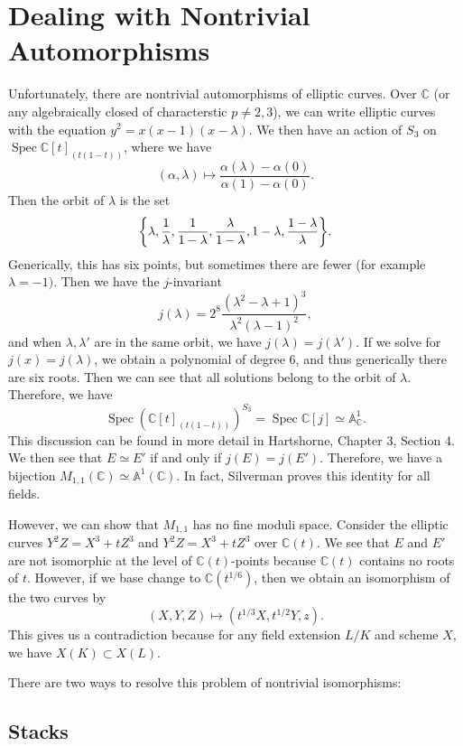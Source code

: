 \documentclass[leqno, openany]{memoir}
\theoremstyle{definition}
\theoremstyle{remark}
\theoremstyle{plain}
\theoremstyle{definition}
\theoremstyle{remark}
\newcommand{\A}{\mathbb{A}}
\newcommand{\C}{\mathbb{C}}
\DeclareMathOperator{\Spec}{Spec}
\begin{document}
\section{Dealing with Nontrivial Automorphisms}%
\label{sec:dealing_with_nontrivial_automorphisms}


Unfortunately, there are nontrivial automorphisms of elliptic curves. Over $\C$ (or any algebraically closed of characterstic $p \neq 2,3$), we can write elliptic curves with the equation $y^2 = x(x-1)(x-\lambda)$. We then have an action of $S_3$ on $\Spec \C[t]_{(t(1-t))}$, where we have
\[ (\alpha, \lambda) \mapsto \frac{\alpha(\lambda) - \alpha(0)}{\alpha(1) - \alpha(0)}. \]
Then the orbit of $\lambda$ is the set 
\[ \qty{ \lambda, \frac{1}{\lambda}, \frac{1}{1-\lambda}, \frac{\lambda}{1-\lambda}, 1-\lambda, \frac{1- \lambda}{\lambda} }. \]
Generically, this has six points, but sometimes there are fewer (for example $\lambda = -1)$. Then we have the $j$-invariant
\[ j(\lambda) = 2^8 \frac{(\lambda^2 - \lambda + 1)^3}{\lambda^2(\lambda - 1)^2}, \]
and when $\lambda, \lambda'$ are in the same orbit, we have $j(\lambda) = j(\lambda')$. If we solve for $j(x) = j(\lambda)$, we obtain a polynomial of degree $6$, and thus generically there are six roots. Then we can see that all solutions belong to the orbit of $\lambda$. Therefore, we have
\[ \Spec (\C[t]_{(t(1-t))})^{S_3} = \Spec \C[j] \simeq \A^1_{\C}. \]
This discussion can be found in more detail in Hartshorne, Chapter 3, Section 4. We then see that $E \simeq E'$ if and only if $j(E) = j(E')$. Therefore, we have a bijection $M_{1,1}(\C) \simeq \A^1(\C)$. In fact, Silverman proves this identity for all fields.

However, we can show that $M_{1,1}$ has no fine moduli space. Consider the elliptic curves $Y^2Z = X^3 + tZ^3$ and $Y^2Z = X^3+tZ^3$ over $\C(t)$. We see that $E$ and $E'$ are not isomorphic at the level of $\C(t)$-points because $\C(t)$ contains no roots of $t$. However, if we base change to $\C(t^{1/6})$, then we obtain an isomorphism of the two curves by
\[ (X,Y,Z) \mapsto (t^{1/3}X, t^{1/2}Y, z). \]
This gives us a contradiction because for any field extension $L/K$ and scheme $X$, we have $X(K) \subset X(L)$.

There are two ways to resolve this problem of nontrivial isomorphisms:

\subsection{Stacks}%
\label{sub:stacks}
\end{document}
